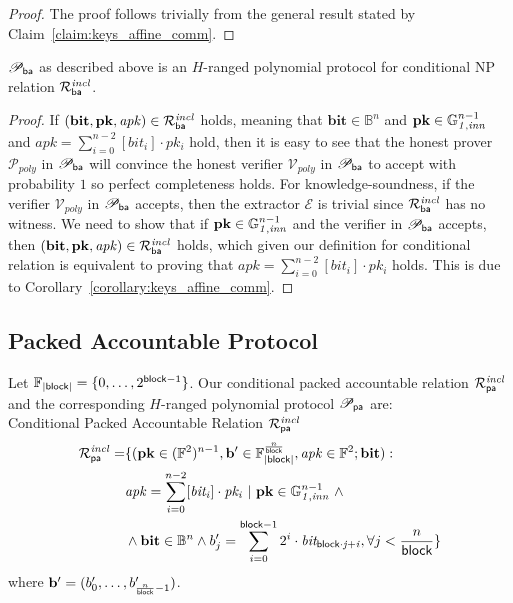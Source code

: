 \begin{proof}The proof follows trivially from the general result stated by Claim~\ref{claim:keys_affine_comm}. 
\end{proof}
\vspace{-0.1in}

\begin{lemma} 
\label{le:ba}
$\mathscr{P}_{\mathsf{ba}}$ as described above is an $H$-ranged polynomial 
protocol for conditional NP relation $\mathcal{R}^{\mathit{incl}}_{\mathsf{ba}}$.
\end{lemma}
\vspace{-0.15in}

\begin{proof}
If $(\mathbf{bit},\mathbf{pk}, \mathit{apk}) \in \mathcal{R}^{\mathit{incl}}_{\mathsf{ba}}$ holds, 
meaning that $\mathbf{bit} \in \mathbb{B}^n$ and $\mathbf{pk} \in \mathbb{G}_{\mathit{1,inn}}^{n-1}$ and $\mathit{apk} = \sum_{i=0}^{n-2} [\mathit{bit_i}] \cdot \mathit{pk_i}$ hold, 
then it is easy to see that the honest prover $\mathcal{P}_{poly}$ in $\mathscr{P}_{\mathsf{ba}}$ will convince the honest verifier $\mathcal{V}_{poly}$ in 
$\mathscr{P}_{\mathsf{ba}}$ to accept with probability $1$ so perfect completeness holds. 
For knowledge-soundness, if the verifier $\mathcal{V}_{poly}$ in $\mathscr{P}_{\mathsf{ba}}$ accepts, 
then the extractor $\mathcal{E}$ is trivial since $\mathcal{R}^{\mathit{incl}}_{\mathsf{ba}}$ has no witness.  
We need to show that if $\mathbf{pk} \in \mathbb{G}_{\mathit{1,inn}}^{n-1}$ and the verifier in $\mathscr{P}_{\mathsf{ba}}$ accepts, 
then $(\mathbf{bit},\mathbf{pk}, \mathit{apk}) \in \mathcal{R}^{\mathit{incl}}_{\mathsf{ba}}$ holds, which given our definition for conditional relation is 
equivalent to proving that $\mathit{apk} = \sum_{i=0}^{n-2} [\mathit{bit_i}] \cdot \mathit{pk_i}$ holds. This is due to 
Corollary~\ref{corollary:keys_affine_comm}. \end{proof}
\vspace{-0.15in}
\subsection{Packed Accountable Protocol}
\label{sec_a}
Let $\mathbb{F}_{|\mathsf{block}|} = \{0, \ldots, 2^{\mathsf{block} -1} \}$.%
Our conditional packed accountable relation $\mathcal{R}^{\mathit{incl}}_{\mathsf{pa}}$ and the corresponding $H$-ranged polynomial protocol 
$\mathscr{P}_{\mathsf{pa}}$ are:\\
 
\noindent \textsf{Conditional Packed Accountable Relation $\mathcal{R}^{\mathit{incl}}_{\mathsf{pa}}$} 
\begin{equation*}
\begin{split}
\mathcal{R}^{\mathit{incl}}_{\mathsf{pa}} = & \{(\mathbf{pk} \in (\mathbb{F}^2)^{n-1},\mathbf{b'} \in \mathbb{F}_{|\mathsf{block}|}^{\frac{n}{\mathsf{block}}},
\mathit{apk} \in \mathbb{F}^2; \mathbf{bit}) : \\ 
 & \mathit{apk} = \sum_{i=0}^{n-2} [\mathit{bit_i}] \cdot \mathit{pk_i} \ | \ \mathbf{pk} \in \mathbb{G}_{\mathit{1,inn}}^{n-1} \ \wedge \\
 & \wedge \mathbf{bit} \in \mathbb{B}^n  \wedge b'_{j} = \sum_{i=0}^{\mathsf{block} -1}2^i \cdot \mathit{bit_{\mathsf{block} \cdot j + i}}, \forall j < \frac{n}{\mathsf{block}} \} 
\end{split}
\end{equation*}
where $\mathbf{b'} = (b'_{0}, \ldots, b'_{{\frac{n}{\mathsf{block}}} -1})$.

